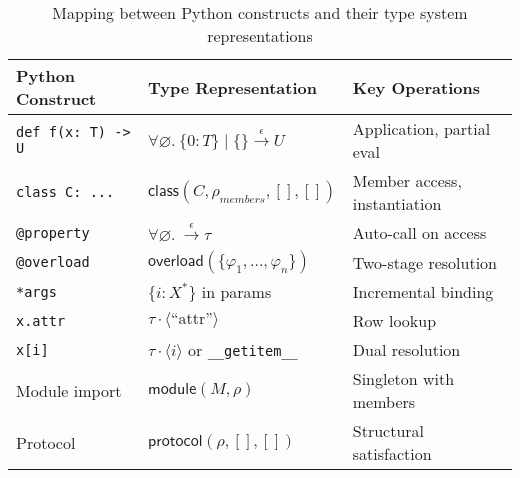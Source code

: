 \begin{table*}[ht]
\centering
\begin{tabular}{|l|l|l|}
\hline
\textbf{Python Construct} & \textbf{Type Representation} & \textbf{Key Operations} \\
\hline
\texttt{def f(x: T) -> U} & $\forall\varnothing.\ \{0:T\} \mid \{\} \xrightarrow{\epsilon} U$ & Application, partial eval \\
\texttt{class C: ...} & $\mathsf{class}(C, \rho_{\mathit{members}}, [], [])$ & Member access, instantiation \\
\texttt{@property} & $\forall\varnothing.\ \xrightarrow{\epsilon} \tau$ & Auto-call on access \\
\texttt{@overload} & $\mathsf{overload}(\{\varphi_1, \ldots, \varphi_n\})$ & Two-stage resolution \\
\texttt{*args} & $\{i: X^*\}$ in params & Incremental binding \\
\texttt{x.attr} & $\tau \cdot \langle\text{``attr''}\rangle$ & Row lookup \\
\texttt{x[i]} & $\tau \cdot \langle i\rangle$ or \texttt{\_\_getitem\_\_} & Dual resolution \\
Module import & $\mathsf{module}(M, \rho)$ & Singleton with members \\
Protocol & $\mathsf{protocol}(\rho, [], [])$ & Structural satisfaction \\
\hline
\end{tabular}
\caption{Mapping between Python constructs and their type system representations}
\end{table*}
